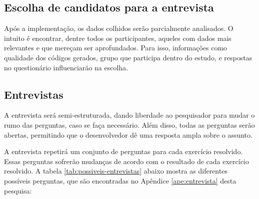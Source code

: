\subsection{Escolha de candidatos para a entrevista}

Após a implementação, os dados colhidos serão parcialmente analisados. O intuito
é encontrar, dentre todos os participantes, aqueles com dados mais relevantes
e que mereçam ser aprofundados.
Para isso, informações como qualidade dos códigos gerados, grupo que participa
dentro do estudo, e respostas no questionário influenciarão na escolha.

\subsection{Entrevistas}
\label{sec:planejamento-estrategia-entrevistas}

A entrevista será semi-estruturada, dando liberdade ao
pesquisador para mudar o rumo das perguntas, caso se faça necessário.
Além disso, todas as perguntas serão abertas, permitindo que o desenvolvedor dê
uma resposta ampla sobre o assunto.

A entrevista repetirá um conjunto de perguntas para cada exercício resolvido.
Essas perguntas sofrerão mudanças de acordo com o resultado de cada exercício resolvido.
A tabela \ref{tab:possiveis-entrevistas} abaixo mostra as diferentes possíveis perguntas, que são encontradas
no Apêndice \ref{ape:entrevista} desta pesquisa:

